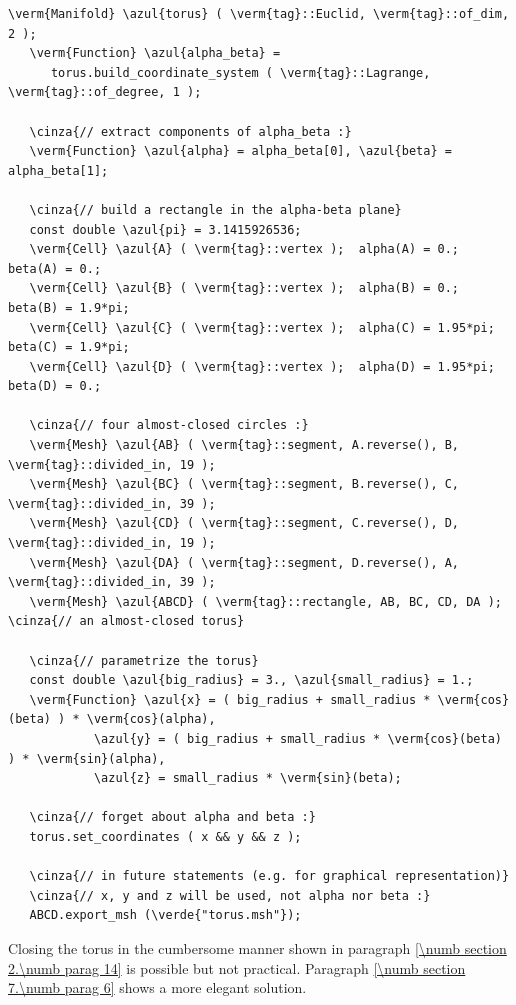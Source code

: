 \begin{Verbatim}[commandchars=\\\{\},formatcom=\small\tt,frame=single,
   label=parag-\ref{\numb section 2.\numb parag 15}.cpp,rulecolor=\color{coment},
   baselinestretch=0.94,framesep=2mm]
   \verm{Manifold} \azul{torus} ( \verm{tag}::Euclid, \verm{tag}::of_dim, 2 );
   \verm{Function} \azul{alpha_beta} =
      torus.build_coordinate_system ( \verm{tag}::Lagrange, \verm{tag}::of_degree, 1 );

   \cinza{// extract components of alpha_beta :}
   \verm{Function} \azul{alpha} = alpha_beta[0], \azul{beta} = alpha_beta[1];

   \cinza{// build a rectangle in the alpha-beta plane}
   const double \azul{pi} = 3.1415926536;
   \verm{Cell} \azul{A} ( \verm{tag}::vertex );  alpha(A) = 0.;       beta(A) = 0.;
   \verm{Cell} \azul{B} ( \verm{tag}::vertex );  alpha(B) = 0.;       beta(B) = 1.9*pi;
   \verm{Cell} \azul{C} ( \verm{tag}::vertex );  alpha(C) = 1.95*pi;  beta(C) = 1.9*pi;
   \verm{Cell} \azul{D} ( \verm{tag}::vertex );  alpha(D) = 1.95*pi;  beta(D) = 0.;

   \cinza{// four almost-closed circles :}
   \verm{Mesh} \azul{AB} ( \verm{tag}::segment, A.reverse(), B, \verm{tag}::divided_in, 19 );
   \verm{Mesh} \azul{BC} ( \verm{tag}::segment, B.reverse(), C, \verm{tag}::divided_in, 39 );
   \verm{Mesh} \azul{CD} ( \verm{tag}::segment, C.reverse(), D, \verm{tag}::divided_in, 19 );
   \verm{Mesh} \azul{DA} ( \verm{tag}::segment, D.reverse(), A, \verm{tag}::divided_in, 39 );
   \verm{Mesh} \azul{ABCD} ( \verm{tag}::rectangle, AB, BC, CD, DA );  \cinza{// an almost-closed torus}
   
   \cinza{// parametrize the torus}
   const double \azul{big_radius} = 3., \azul{small_radius} = 1.;
   \verm{Function} \azul{x} = ( big_radius + small_radius * \verm{cos}(beta) ) * \verm{cos}(alpha),
            \azul{y} = ( big_radius + small_radius * \verm{cos}(beta) ) * \verm{sin}(alpha),
            \azul{z} = small_radius * \verm{sin}(beta);

   \cinza{// forget about alpha and beta :}
   torus.set_coordinates ( x && y && z );

   \cinza{// in future statements (e.g. for graphical representation)}
   \cinza{// x, y and z will be used, not alpha nor beta :}
   ABCD.export_msh (\verde{"torus.msh"});
\end{Verbatim}

Closing the torus in the cumbersome manner shown in paragraph
\ref{\numb section 2.\numb parag 14} is possible but not practical.
Paragraph \ref{\numb section 7.\numb parag 6} shows a more elegant solution.

